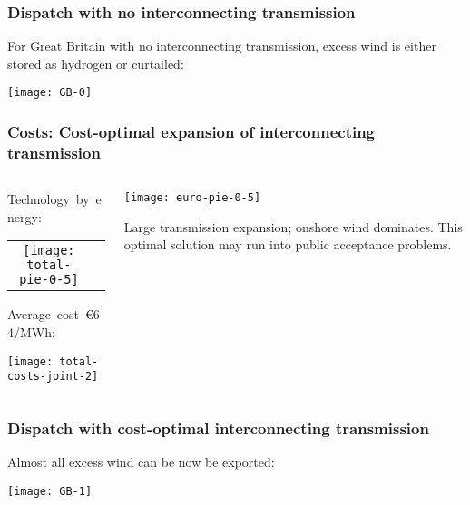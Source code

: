 \documentclass[10pt,aspectratio=169,dvipsnames]{beamer}
\begin{document}
\begin{frame}
  \frametitle{Dispatch with no interconnecting transmission}

  For Great Britain with no interconnecting transmission, excess wind is either stored as hydrogen or curtailed:

  \centering
  \texttt{[image: GB-0]}
\end{frame}


\begin{frame}
  \frametitle{Costs: Cost-optimal expansion of interconnecting transmission}


\begin{columns}[T]
  \begin{column}{5.3cm}

  Technology~by~energy:
    \begin{tabular}{cc}
    \texttt{[image: total-pie-0-5]} &
  \end{tabular}

  Average~cost~\alert{\euro 64/MWh}:

  \texttt{[image: total-costs-joint-2]}

  \end{column}

  \begin{column}{9cm}
    \centering
    \texttt{[image: euro-pie-0-5]}

    \raggedright
    Large transmission expansion; onshore wind dominates. This optimal solution may run into public acceptance problems.
  \end{column}


\end{columns}

\end{frame}


\begin{frame}
  \frametitle{Dispatch with cost-optimal interconnecting transmission}

  Almost all excess wind can be now be exported:

  \centering
  \texttt{[image: GB-1]}
\end{frame}
\end{document}
